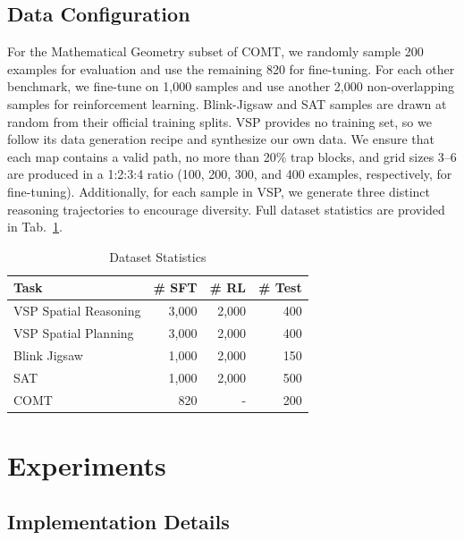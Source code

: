 \subsection{Data Configuration}

For the Mathematical Geometry subset of COMT, we randomly sample 200 examples for evaluation and use the remaining 820 for fine-tuning.
For each other benchmark, we fine-tune on 1,000 samples and use another 2,000 non-overlapping samples for reinforcement learning. Blink-Jigsaw and SAT samples are drawn at random from their official training splits. VSP provides no training set, so we follow its data generation recipe and synthesize our own data. We ensure that each map contains a valid path, no more than 20\% trap blocks, and grid sizes 3–6 are produced in a 1:2:3:4 ratio (100, 200, 300, and 400 examples, respectively, for fine-tuning). Additionally, for each sample in VSP, we generate three distinct reasoning trajectories to encourage diversity. Full dataset statistics are provided in Tab.~\ref{tab:dataset-statistics}.

\begin{table}[h]
    \centering
    \caption{Dataset Statistics}
    \begin{tabular}{lrrr}
        \toprule
        Task & \# SFT & \# RL & \# Test\\
        \midrule
        VSP Spatial Reasoning & 3,000 & 2,000 & 400\\
        VSP Spatial Planning & 3,000 & 2,000 & 400 \\
        Blink Jigsaw & 1,000 & 2,000 & 150\\
        SAT & 1,000 & 2,000 & 500 \\
        COMT & 820 & - & 200 \\
        \bottomrule
    \end{tabular}
    \label{tab:dataset-statistics}
\end{table}


\section{Experiments}

\subsection{Implementation Details}

